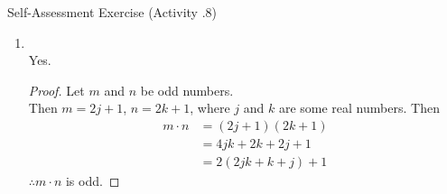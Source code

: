 \documentclass[\main/notes.tex]{subfiles}
\begin{document}
\begin{exercise}{Self-Assessment Exercise (Activity \thechapter.8)}
\begin{enumerate}
					Yes.
					\begin{proof}
						Let $m$ and $n$ be even numbers.\\
						Then $m = 2j$, $n = 2k$, where $j$ and $k$ are some real numbers.\\
						Then
						\begin{align*}
							m + n &= 2j + 2k\\
							&= 2(j + k)
						\end{align*}
						As the sum of the two numbers is a multiple of $2$, $m + n$ is even.
					\end{proof}
					\pagebreak
					\item {}\\
					Yes.
					\begin{proof}
						Let $m$ and $n$ be odd numbers.\\
						Then $m = 2j + 1$, $n = 2k + 1$, where $j$ and $k$ are some real numbers.
						Then
						\begin{align*}
							m\cdot n &= (2j + 1)(2k + 1)\\
							&= 4jk + 2k + 2j + 1\\
							&= 2(2jk + k + j) + 1
						\end{align*}
						$\therefore m \cdot n$ is odd. 
					\end{proof}
				\end{enumerate}
			\end{exercise}
\end{document}
